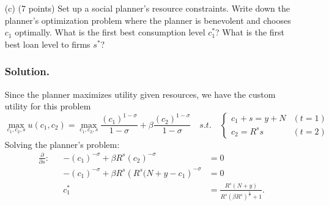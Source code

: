 \documentclass[12pt]{article}
\begin{document}
\begin{enumerate}
\begin{enumerate}
        \item[(c)] {(7 points)} Set up a social planner’s resource constraints. Write down the planner’s optimization problem where the planner is benevolent and chooses $c_1$ optimally. What is the first best consumption level $c^*_1$? What is the first best loan level to firms $s^*$?
        \subsubsection*{Solution.}

        Since the planner maximizes utility given resources, we have the custom utility for this problem 
        \[ \max_{c_1,c_2,s}   
    u(c_1, c_2) = \max_{c_1,c_2,s} \frac{(c_1)^{1-\sigma}}{1 - \sigma} + \beta \frac{(c_2)^{1-\sigma}}{1 - \sigma} 
    \quad s.t. \quad \begin{cases}
        c_1 + s = y + N & (t=1)
        \\ c_2 = R^ss & (t=2)
    \end{cases} %
    \]
    Solving the planner's problem: 
    \begin{align*}
       \frac{\partial}{\partial s}: && -\left( c_1\right)^{-\sigma} + \beta R^s \left(c_2 \right)^{-\sigma} &=0
       \\ && -\left( c_1\right)^{-\sigma} + \beta R^s \left(R^s(N+y-c_1 \right)^{-\sigma} &=0
       \\  && c_1^* &= \frac{R^{s}(N+y)}{R^{s}\left(\beta R^{s}\right)^{\frac{1}{\sigma}}+1}.
    \end{align*}

        
    \end{enumerate}


\end{enumerate}
\end{document}
